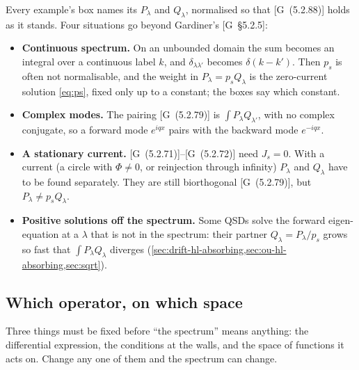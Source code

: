 \documentclass[11pt]{article}
\numberwithin{equation}{section}
\newcommand{\G}[1]{[G~(#1)]}
\newcommand{\Gs}[1]{[G~\S#1]}
\begin{document}
Every example's box names its $P_\lambda$ and $Q_\lambda$, normalised so that \G{5.2.88} holds as it stands.
Four situations go beyond Gardiner's \Gs{5.2.5}:
\begin{itemize}
  \item \textbf{Continuous spectrum.} On an unbounded domain the sum becomes an integral over a continuous label
        $k$, and $\delta_{\lambda\lambda'}$ becomes $\delta(k-k')$. Then $p_s$ is often not normalisable, and the
        weight in $P_\lambda=p_sQ_\lambda$ is the zero-current solution \cref{eq:ps}, fixed only up to a constant;
        the boxes say which constant.
  \item \textbf{Complex modes.} The pairing \G{5.2.79} is $\int P_\lambda Q_{\lambda'}$, with no complex
        conjugate, so a forward mode $e^{iqx}$ pairs with the backward mode $e^{-iqx}$.
  \item \textbf{A stationary current.} \G{5.2.71}--\G{5.2.72} need $J_s=0$. With a current (a circle with $\Phi\ne0$,
        or reinjection through infinity) $P_\lambda$ and $Q_\lambda$ have to be found separately. They are still
        biorthogonal \G{5.2.79}, but $P_\lambda\neq p_sQ_\lambda$.
  \item \textbf{Positive solutions off the spectrum.} Some QSDs solve the forward eigen-equation at a $\lambda$
        that is not in the spectrum: their partner $Q_\lambda=P_\lambda/p_s$ grows so fast that
        $\int P_\lambda Q_\lambda$ diverges (\cref{sec:drift-hl-absorbing,sec:ou-hl-absorbing,sec:sqrt}).
\end{itemize}

\subsection{Which operator, on which space}
\label{sec:operator}

Three things must be fixed before ``the spectrum'' means anything: the differential expression, the conditions
at the walls, and the space of functions it acts on. Change any one of them and the spectrum can change.
\end{document}
